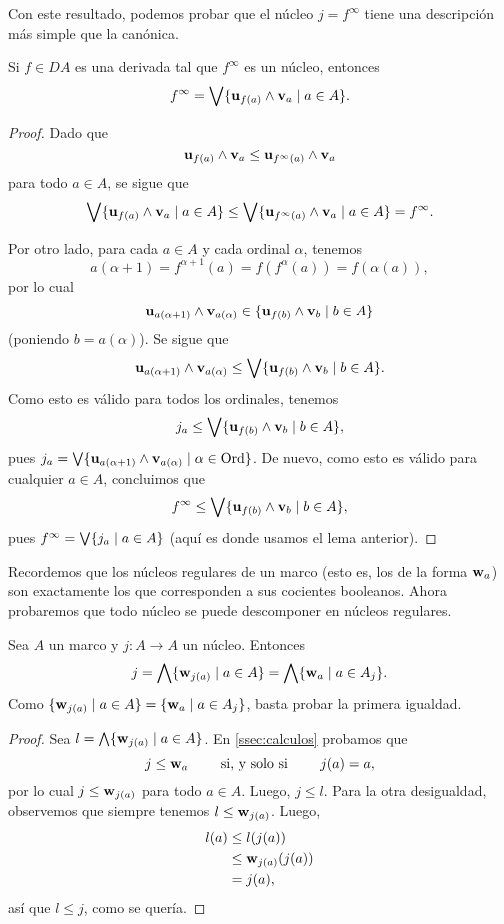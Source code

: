 Con este resultado, podemos probar que el núcleo $j=f^\infty$
tiene una descripción más simple que la canónica.

\begin{lemma}
  Si $f\in DA$ es una derivada tal que $f^\infty$ es un núcleo,
  entonces
  \[
    f^\infty = \bigvee\{\mathbf u_{f(a)}\wedge\mathbf v_{a} \mid a\in A\}
  .\]
\end{lemma}
\begin{proof}
  Dado que
  \[
    \mathbf u_{f(a)}\wedge\mathbf v_{a}\leq \mathbf u_{f^\infty(a)}\wedge\mathbf v_{a}
  \]
  para todo $a\in A$, se sigue que
  \[
    \bigvee\{\mathbf u_{f(a)}\wedge\mathbf v_{a} \mid a\in A\}
    \leq
    \bigvee\{\mathbf u_{f^\infty(a)}\wedge\mathbf v_{a} \mid a\in A\}
    = f^\infty
  .\]

  Por otro lado, para cada $a\in A$ y cada ordinal $\alpha$, tenemos
  \[
    a(\alpha+1)=f^{\alpha+1}(a)=f(f^\alpha(a))=f(\alpha(a))
  ,\]
  por lo cual
  \[
     \mathbf u_{a(\alpha+1)}\wedge\mathbf v_{a(\alpha)}
     \in
     \{\mathbf u_{f(b)}\wedge\mathbf v_{b} \mid b\in A\}
  \]
  (poniendo $b=a(\alpha)$).
  Se sigue que
  \[
     \mathbf u_{a(\alpha+1)}\wedge\mathbf v_{a(\alpha)}
     \leq
     \bigvee\{\mathbf u_{f(b)}\wedge\mathbf v_{b} \mid b\in A\}
  .\]
  Como esto es válido para todos los ordinales, tenemos
  \[
     j_a\leq \bigvee\{\mathbf u_{f(b)}\wedge\mathbf v_{b} \mid b\in A\}
  ,\]
  pues $j_a = \bigvee\{\mathbf u_{a(\alpha+1)}\wedge\mathbf v_{a(\alpha)}
   \mid\alpha\in\mathrm{Ord}\}$.
  De nuevo, como esto es válido para cualquier $a\in A$, concluimos
  que
  \[
     f^\infty\leq \bigvee\{\mathbf u_{f(b)}\wedge\mathbf v_{b} \mid b\in A\}
  ,\]
  pues $f^\infty = \bigvee\{j_a\mid a\in A\}$ (aquí es donde usamos
  el lema anterior).
\end{proof}

Recordemos que los núcleos regulares de un marco
(esto es, los de la forma $\mathbf w_{a}$) son exactamente
los que corresponden a sus cocientes booleanos.
Ahora probaremos que todo núcleo se puede descomponer en
núcleos regulares.

\begin{theorem}
    Sea $A$ un marco y $j:A\to A$ un núcleo.
    Entonces
    \[
        j
        = \bigwedge\{\mathbf w_{j(a)}\mid a\in A\}
        = \bigwedge\{\mathbf w_{a}\mid a\in A_j\}
    .\]
    Como $\{\mathbf w_{j(a)}\mid a\in A\}=\{\mathbf w_{a} \mid a\in A_j\}$,
    basta probar la primera igualdad.
\end{theorem}
\begin{proof}
    Sea $l = \bigwedge\{\mathbf w_{j(a)}\mid a\in A\}$.
    En \ref{ssec:calculos} probamos que
    \[
        j\leq\mathbf w_{a} \qquad\text{ si, y solo si }\qquad j(a) = a
    ,\]
    por lo cual $j\leq \mathbf w_{j(a)}$ para todo $a\in A$.
    Luego, $j\leq l$.
    Para la otra desigualdad,
    observemos que siempre tenemos $l\leq\mathbf w_{j(a)}$.
    Luego,
    \begin{align*}
        l(a)
        &\leq l(j(a)) \\
        &\leq \mathbf w_{j(a)}(j(a)) \\
        &= j(a),
    \end{align*}
    así que $l\leq j$, como se quería.
\end{proof}


